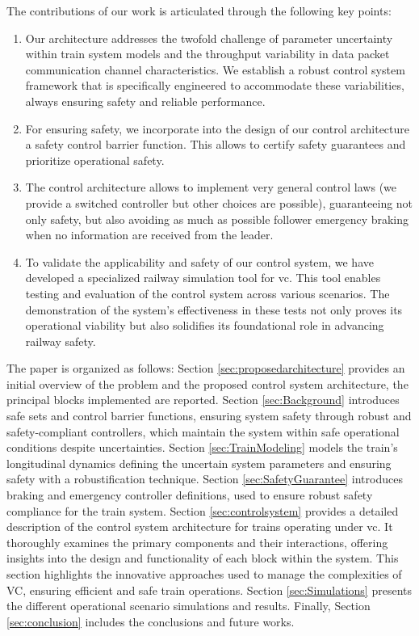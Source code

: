 \documentclass[letterpaper, 10 pt, conference]{ieeeconf}
\theoremstyle{definition}
\theoremstyle{nopoint}
\begin{document}
The contributions of our work is articulated through the following key points:

\begin{enumerate}
	
 \item Our architecture addresses the twofold challenge of parameter uncertainty within train system models and the throughput variability in data packet communication channel characteristics. We establish a robust control system framework that is specifically engineered to accommodate these variabilities, always ensuring safety and reliable performance.


\item For ensuring safety, we incorporate into the design of our control architecture a safety control barrier function. This allows to certify safety guarantees and  prioritize operational safety.

\item The control architecture allows to implement very general control laws (we provide a switched controller but other choices are possible), guaranteeing not only safety, but also  avoiding as much as possible follower emergency braking when no information are received from the leader.

\item To validate the applicability and safety of our control system, we have developed a specialized railway simulation tool for \gls{vc}. This tool enables testing and evaluation of the control system across various scenarios. The demonstration of the system's effectiveness in these tests not only proves its operational viability but also solidifies its foundational role in advancing railway safety.
\end{enumerate}
%
The paper is organized as follows: Section \ref{sec:proposedarchitecture} provides an initial overview of the problem and the proposed control system architecture, the principal blocks implemented are reported. Section \ref{sec:Background} introduces safe sets and control barrier functions, ensuring system safety through robust and safety-compliant controllers, which maintain the system within safe operational conditions despite uncertainties. Section \ref{sec:TrainModeling} models the train's longitudinal dynamics defining the uncertain system parameters and ensuring safety with a robustification technique.
  Section \ref{sec:SafetyGuarantee} introduces braking and emergency controller definitions, used to ensure robust safety compliance for the train system.
  Section \ref{sec:controlsystem} provides a detailed description of the control system architecture for trains operating under \gls{vc}. It thoroughly examines the primary components and their interactions, offering insights into the design and functionality of each block within the system. This section highlights the innovative approaches used to manage the complexities of VC, ensuring efficient and safe train operations. Section \ref{sec:Simulations} presents the different operational scenario simulations
  and results. Finally, Section \ref{sec:conclusion} includes the conclusions and future works.
  
\end{document}
